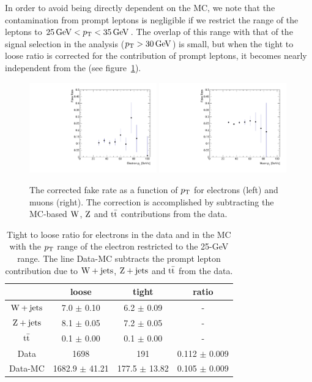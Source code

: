 In order to avoid being directly dependent on the MC, we note that the
contamination from prompt leptons is negligible if we restrict the \pt range
of the leptons to $\unit[25]{GeV} < \pt < \unit[35]{GeV}$. The overlap of
this \pt range with that of the signal selection in the analysis ($\pt >
\unit[30]{GeV}$) is small, but when the tight to loose ratio is corrected
for the contribution of prompt leptons, it becomes nearly independent from
the \pt (see figure~\ref{fig:CorFRvsLepPt}).
\begin{figure}[htb]
    \centering
\includegraphics[width=0.49\textwidth]{images/pdf/h_FR_ElPt} \hfill
\includegraphics[width=0.49\textwidth]{images/pdf/h_FR_MuPt} \\ 
\caption{The corrected fake rate as a function of $p_\mathrm{T}$ for electrons (left) and muons (right). The correction is accomplished by subtracting the MC-based 
         $\mathrm{W}$, $\mathrm{Z}$ and $\mathrm{t}\bar{\mathrm{t}}$ contributions from the data.}
\label{fig:CorFRvsLepPt}
\end{figure}
\begin{table}[htb]
    \centering
\begin{tabular}{*4c}
    \toprule
 & 	 loose & 	 tight & 	 ratio \\
 \midrule
$\mathrm{W} + \text{jets}$ & 	 7.0 $\pm$ 0.10 & 	 6.2 $\pm$ 0.09 & 	- \\
$\mathrm{Z} + \text{jets}$ & 	 8.1 $\pm$ 0.05 & 	 7.2 $\pm$ 0.05 & 	- \\
$\mathrm{t}\bar{\mathrm{t}}$ & 	 0.1 $\pm$ 0.00 & 	 0.1 $\pm$ 0.00 & 	- \\
\midrule
Data & 	 1698 & 	  191 & 	0.112 $\pm$ 0.009 \\
Data-MC &	1682.9 $\pm$ 41.21 & 	177.5 $\pm$ 13.82 & 	0.105 $\pm$ 0.009 \\
\bottomrule
\end{tabular}
\caption{Tight to loose ratio for electrons in the data and in the MC with
    the $p_\mathrm{T}$ range of
    the electron restricted to the 25-\unit[35]{GeV} range.
The line Data-MC subtracts the prompt lepton contribution due to $\mathrm{W} + \text{jets}$,
$\mathrm{Z} + \text{jets}$ and $\mathrm{t}\bar{\mathrm{t}}$ from the data.}
\label{tab:FRwMCEl_Pt2535}
\end{table}


